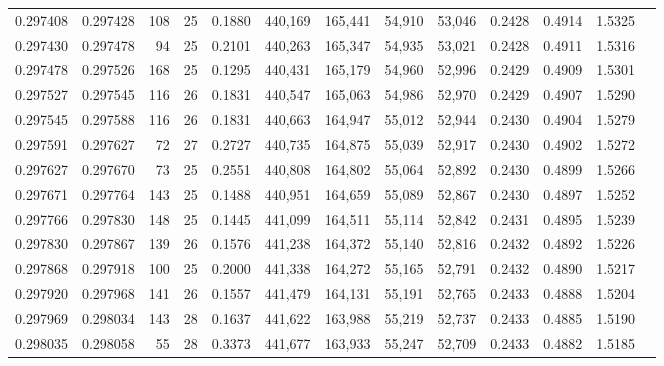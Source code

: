 \begin{tabular}{rrrrrrrrrrrrr}
0.297408 & 0.297428 &   108 &  25 &                                     0.1880 & 440,169 & 165,441 &  54,910 &  53,046 & 0.2428 & 0.4914 & 1.5325 \\
0.297430 & 0.297478 &    94 &  25 &                                     0.2101 & 440,263 & 165,347 &  54,935 &  53,021 & 0.2428 & 0.4911 & 1.5316 \\
0.297478 & 0.297526 &   168 &  25 &                                     0.1295 & 440,431 & 165,179 &  54,960 &  52,996 & 0.2429 & 0.4909 & 1.5301 \\
0.297527 & 0.297545 &   116 &  26 &                                     0.1831 & 440,547 & 165,063 &  54,986 &  52,970 & 0.2429 & 0.4907 & 1.5290 \\
0.297545 & 0.297588 &   116 &  26 &                                     0.1831 & 440,663 & 164,947 &  55,012 &  52,944 & 0.2430 & 0.4904 & 1.5279 \\
0.297591 & 0.297627 &    72 &  27 &                                     0.2727 & 440,735 & 164,875 &  55,039 &  52,917 & 0.2430 & 0.4902 & 1.5272 \\
0.297627 & 0.297670 &    73 &  25 &                                     0.2551 & 440,808 & 164,802 &  55,064 &  52,892 & 0.2430 & 0.4899 & 1.5266 \\
0.297671 & 0.297764 &   143 &  25 &                                     0.1488 & 440,951 & 164,659 &  55,089 &  52,867 & 0.2430 & 0.4897 & 1.5252 \\
0.297766 & 0.297830 &   148 &  25 &                                     0.1445 & 441,099 & 164,511 &  55,114 &  52,842 & 0.2431 & 0.4895 & 1.5239 \\
0.297830 & 0.297867 &   139 &  26 &                                     0.1576 & 441,238 & 164,372 &  55,140 &  52,816 & 0.2432 & 0.4892 & 1.5226 \\
0.297868 & 0.297918 &   100 &  25 &                                     0.2000 & 441,338 & 164,272 &  55,165 &  52,791 & 0.2432 & 0.4890 & 1.5217 \\
0.297920 & 0.297968 &   141 &  26 &                                     0.1557 & 441,479 & 164,131 &  55,191 &  52,765 & 0.2433 & 0.4888 & 1.5204 \\
0.297969 & 0.298034 &   143 &  28 &                                     0.1637 & 441,622 & 163,988 &  55,219 &  52,737 & 0.2433 & 0.4885 & 1.5190 \\
0.298035 & 0.298058 &    55 &  28 &                                     0.3373 & 441,677 & 163,933 &  55,247 &  52,709 & 0.2433 & 0.4882 & 1.5185 \\

\end{tabular}

